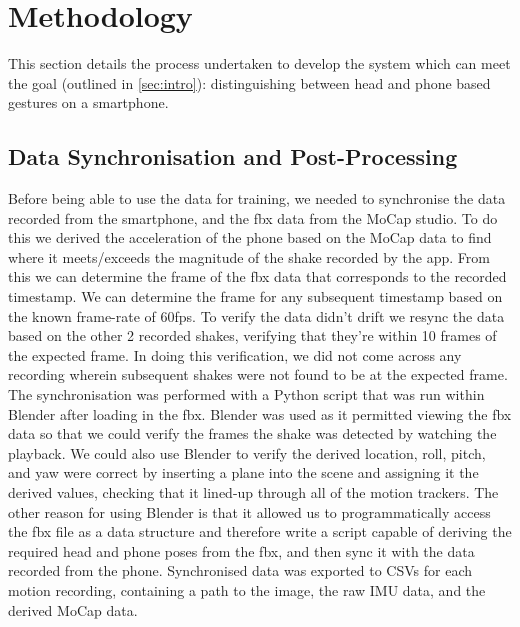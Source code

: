 \section{Methodology} %



This section details the process undertaken to develop the system which can meet the goal (outlined in \autoref{sec:intro}): distinguishing between head and phone based gestures on a smartphone.




\subsection{Data Synchronisation and Post-Processing}
Before being able to use the data for training, we needed to synchronise the data recorded from the smartphone, and the fbx data from the MoCap studio.
To do this we derived the acceleration of the phone based on the MoCap data to find where it meets/exceeds the magnitude of the shake recorded by the app. From this we can determine the frame of the fbx data that corresponds to the recorded timestamp. We can determine the frame for any subsequent timestamp based on the known frame-rate of 60fps. 
To verify the data didn't drift we resync the data based on the other 2 recorded shakes, verifying that they're within 10 frames of the expected frame. In doing this verification, we did not come across any recording wherein subsequent shakes were not found to be at the expected frame.
The synchronisation was performed with a Python script that was run within Blender after loading in the fbx.
Blender was used as it permitted viewing the fbx data so that we could verify the frames the shake was detected by watching the playback. We could also use Blender to verify the derived location, roll, pitch, and yaw were correct by inserting a plane into the scene and assigning it the derived values, checking that it lined-up through all of the motion trackers.
The other reason for using Blender is that it allowed us to programmatically access the fbx file as a data structure and therefore write a script capable of deriving the required head and phone poses from the fbx, and then sync it with the data recorded from the phone.
Synchronised data was exported to CSVs for each motion recording, containing a path to the image, the raw IMU data, and the derived MoCap data.

